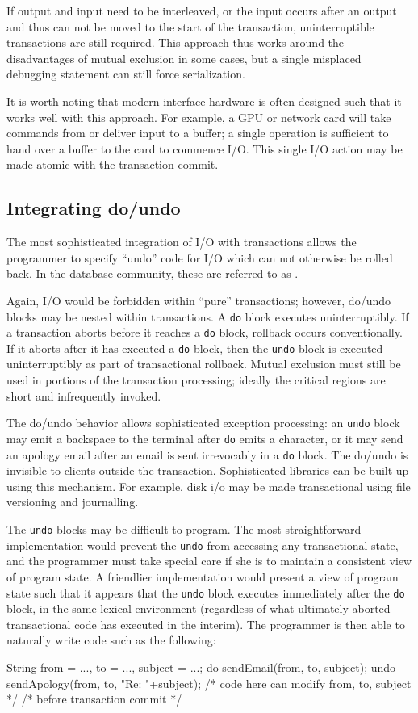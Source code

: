 If output and input need to be interleaved, or the input occurs after
an output and thus can not be moved to the start of the transaction,
uninterruptible transactions are still required.  This approach thus
works around the disadvantages of mutual exclusion in some cases, but
a single misplaced debugging statement can still force serialization.

It is worth noting that modern interface hardware is often designed
such that it works well with this approach.  For example, a GPU
or network card will take commands from or deliver input to a
buffer; a single operation is sufficient to hand over a buffer to
the card to commence I/O.  This single I/O action may be made atomic
with the transaction commit.

\subsection{Integrating do/undo}
The most sophisticated integration of I/O with transactions allows the
programmer to specify ``undo'' code for I/O which can not otherwise be
rolled back.  In the database community, these are referred to as
.

Again, I/O would be forbidden within ``pure'' transactions; however,
do/undo blocks may be nested within transactions.  A \texttt{do} block
executes uninterruptibly.  If a transaction aborts before it reaches a
\texttt{do} block, rollback occurs conventionally.  If it aborts after it
has executed a \texttt{do} block, then the \texttt{undo} block is
executed uninterruptibly as part of transactional rollback.
Mutual exclusion must still be used in portions of the transaction
processing; ideally the critical regions are short and infrequently
invoked.

The do/undo behavior allows sophisticated exception processing: an
\texttt{undo} block may emit a backspace to the terminal after
\texttt{do} emits a character, or it may send an apology email after
an email is sent irrevocably in a \texttt{do} block.  The do/undo is
invisible to clients outside the transaction.  Sophisticated
libraries can be built up using this mechanism.  For example, disk i/o
may be made transactional using file versioning and journalling.

The \texttt{undo} blocks may be difficult to program.  The most
straightforward implementation would prevent the \texttt{undo} from
accessing any transactional state, and the programmer must take
special care if she is to maintain a consistent view of program state.
A friendlier implementation would present a view of program state such
that it appears that the \texttt{undo} block executes immediately
after the \texttt{do} block, in the same lexical environment
(regardless of what ultimately-aborted transactional code has executed
in the interim).  The programmer is then able to naturally write code
such as the following:
\begin{inlinecode}
String from = ..., to = ..., subject = ...;
do {
  sendEmail(from, to, subject);
} undo {
  sendApology(from, to, "Re: "+subject);
}
/* code here can modify from, to, subject */
/* before transaction commit */
\end{inlinecode}

